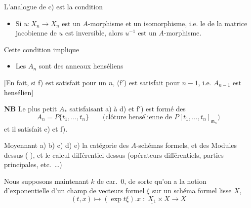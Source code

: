 \documentclass[11pt,a4paper]{article}
\begin{document}
L'analogue de c) est la condition

\begin{itemize}
  \item[f)] Si $u : X_n \to X_n$ est un $A$-morphisme et un isomorphisme,
     i.e. le  \struck{\ill{}} de la matrice
    jacobienne de $u$ est inversible, alors $u^{-1}$ est un $A$-morphisme.
\end{itemize}

Cette condition implique  

\begin{itemize}
  \item[f$'$)] Les $A_n$ sont des anneaux henséliens
\end{itemize}


[En fait, si f) est satisfait pour un $n$, (f$'$) est satisfait pour $n - 1$, i.e.
$A_{n-1}$ est hensélien] 

\textbf{NB} Le plus petit $A_*$ satisfaisant a) à d) et f$'$) est formé des
\[
  A_n = P\{t_1, \ldots, t_n\} \qquad
  \bigl(\text{clôture hensélienne de } P[t_1, \ldots, t_n]_{\mathfrak{m}_n}\bigr)
\]
et il satisfait e) et f).


Moyennant a) b) c) d) e)   la catégorie des
$A$-schémas formels, et des Modules dessus ( \ill{}), et le
calcul différentiel  dessus (opérateurs différentiels, parties
principales, etc.\ \ldots)



Nous supposons maintenant $k$ de car.~$0$, de sorte qu'on a la notion
d'exponentielle d'un champ de vecteurs formel $\xi$ sur  un schéma
formel lisse $X$,
\[
  (t, x) \mapsto (\exp t\xi) . x \;:\; \underline{X_1} \times X \to X
\]
\end{document}
